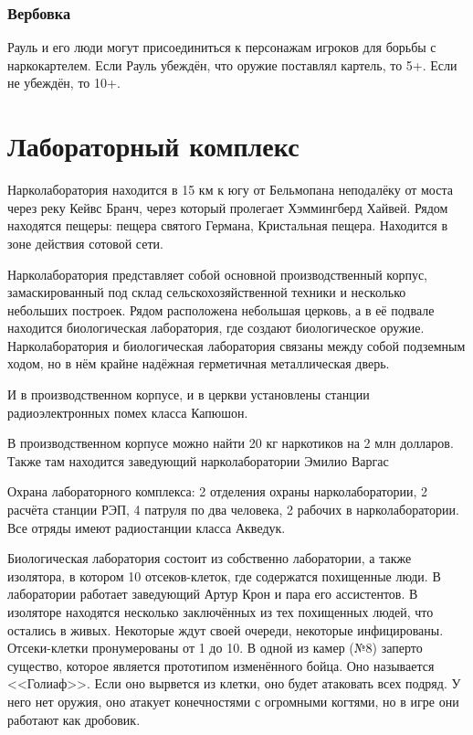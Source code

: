 \documentclass{article}
\begin{document}
\subsubsection{Вербовка}\label{recruitment-mendoza}

Рауль и его люди могут присоединиться к персонажам игроков для борьбы с
наркокартелем. Если Рауль убеждён, что оружие поставлял картель, то 5+.
Если не убеждён, то 10+.

\section{Лабораторный
комплекс}\label{laboratory-complex}

Нарколаборатория находится в 15 км к югу от Бельмопана неподалёку от
моста через реку Кейвс Бранч, через который пролегает Хэммингберд
Хайвей. Рядом находятся пещеры: пещера святого Германа, Кристальная
пещера. Находится в зоне действия сотовой сети.

Нарколаборатория представляет собой основной производственный корпус,
замаскированный под склад сельскохозяйственной техники и несколько
небольших построек. Рядом расположена небольшая церковь, а в её подвале
находится биологическая лаборатория, где создают биологическое оружие.
Нарколаборатория и биологическая лаборатория связаны между собой
подземным ходом, но в нём крайне надёжная герметичная металлическая
дверь.

И в производственном корпусе, и в церкви установлены станции
радиоэлектронных помех класса Капюшон.

В производственном корпусе можно найти 20 кг наркотиков на 2 млн
долларов. Также там находится заведующий нарколаборатории Эмилио Варгас

Охрана лабораторного комплекса: 2 отделения охраны нарколаборатории, 2
расчёта станции РЭП, 4 патруля по два человека, 2 рабочих в
нарколаборатории. Все отряды имеют радиостанции класса Акведук.

Биологическая лаборатория состоит из собственно лаборатории, а также
изолятора, в котором 10 отсеков-клеток, где содержатся похищенные люди.
В лаборатории работает заведующий Артур Крон и пара его ассистентов. В
изоляторе находятся несколько заключённых из тех похищенных людей, что
остались в живых. Некоторые ждут своей очереди, некоторые инфицированы.
Отсеки-клетки пронумерованы от 1 до 10. В одной из камер (№8) заперто
существо, которое является прототипом изменённого бойца. Оно называется
<<Голиаф>>. Если оно вырвется из клетки, оно будет атаковать всех подряд.
У него нет оружия, оно атакует конечностями с огромными когтями, но в
игре они работают как дробовик.
\end{document}

